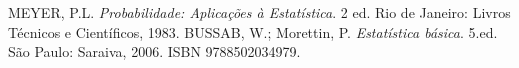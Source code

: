 \thispagestyle{empty}
\begin{thebibliography}{2}
  MEYER, P.L. {\textit{Probabilidade: Aplicações à Estatística}}. 2 ed. Rio de Janeiro: Livros Técnicos e Científicos, 1983.
  BUSSAB, W.; Morettin, P. {\textit{Estatística básica}}. 5.ed. São Paulo: Saraiva, 2006. ISBN 9788502034979.
\end{thebibliography}
